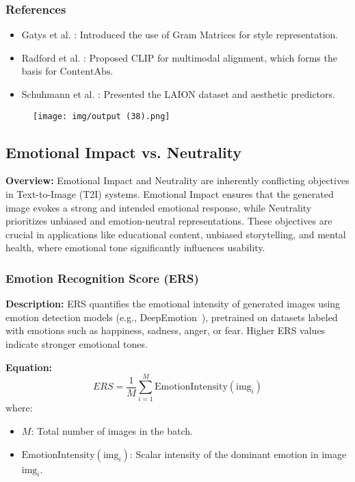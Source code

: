 \subsubsection{References}
\begin{itemize}
    \item Gatys et al. \cite{gatys2016neural}: Introduced the use of Gram Matrices for style representation.
    \item Radford et al. \cite{radford2021learning}: Proposed CLIP for multimodal alignment, which forms the basis for \(\text{ContentAbs}\).
    \item Schuhmann et al. \cite{schuhmann2022laion}: Presented the LAION dataset and aesthetic predictors.
\end{itemize}


\begin{figure}[h!]
    \centering
    \texttt{[image: img/output (38).png]}
    \caption{}
    \label{fig:}
\end{figure}


\subsection{Emotional Impact vs. Neutrality}
\label{subsec:emotional_impact_neutrality}

\textbf{Overview:} Emotional Impact and Neutrality are inherently conflicting objectives in Text-to-Image (T2I) systems. Emotional Impact ensures that the generated image evokes a strong and intended emotional response, while Neutrality prioritizes unbiased and emotion-neutral representations. These objectives are crucial in applications like educational content, unbiased storytelling, and mental health, where emotional tone significantly influences usability.

\subsubsection{Emotion Recognition Score (ERS)}
\textbf{Description:} ERS quantifies the emotional intensity of generated images using emotion detection models (e.g., DeepEmotion~\cite{abidin2018deepemotion}), pretrained on datasets labeled with emotions such as happiness, sadness, anger, or fear. Higher ERS values indicate stronger emotional tones.

\textbf{Equation:}
\begin{equation}
ERS = \frac{1}{M} \sum_{i=1}^M \text{EmotionIntensity}(\text{img}_i)
\end{equation}
where:
\begin{itemize}
    \item \( M \): Total number of images in the batch.
    \item \( \text{EmotionIntensity}(\text{img}_i) \): Scalar intensity of the dominant emotion in image \(\text{img}_i\).
\end{itemize}

